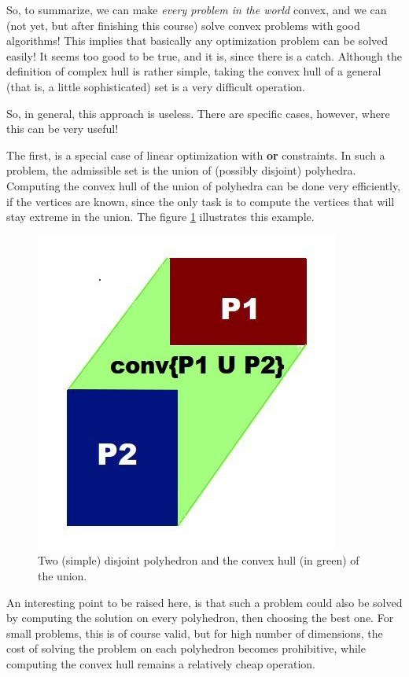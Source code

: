 \documentclass[a4paper]{article}
\begin{document}
So, to summarize, we can make \textit{every problem in the world} convex, and we can (not yet, but after finishing this course) solve convex problems with good algorithms! This implies that basically any optimization problem can be solved easily! It seems too good to be true, and it is, since there is a catch. Although the definition of complex hull is rather simple, taking the convex hull of a general (that is, a little sophisticated) set is a very difficult operation.

So, in general, this approach is useless. There are specific cases, however, where this can be very useful!

The first, is a special case of linear optimization with \textbf{or} constraints. In such a problem, the admissible set is the union of (possibly disjoint) polyhedra. Computing the convex hull of the union of polyhedra can be done very efficiently, if the vertices are known, since the only task is to compute the vertices that will stay extreme in the union. The figure \ref{fig:my_label} illustrates this example.

\begin{figure}[H]
\centering
\includegraphics[scale=.4]{polynoms}
\caption{Two (simple) disjoint polyhedron and the convex hull (in green) of the union.}
\label{fig:my_label}
\end{figure}

An interesting point to be raised here, is that such a problem could also be solved by computing the solution on every polyhedron, then choosing the best one. For small problems, this is of course valid, but for high number of dimensions, the cost of solving the problem on each polyhedron becomes prohibitive, while computing the convex hull remains a relatively cheap operation. 
\end{document}
